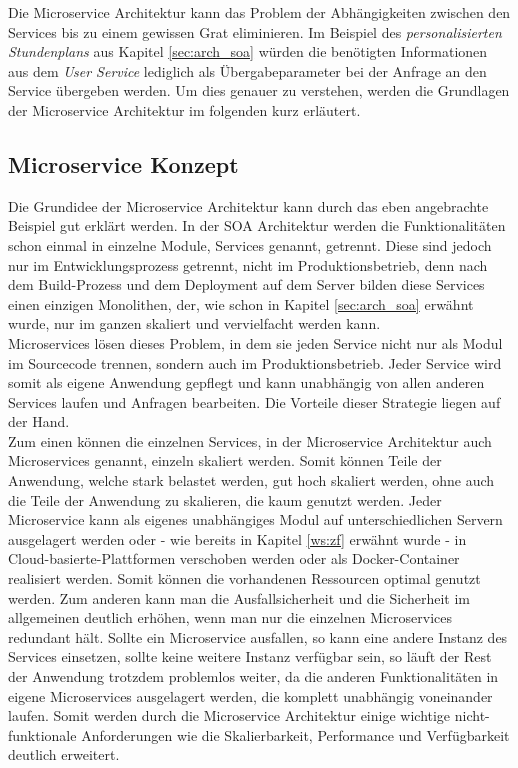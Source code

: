 Die Microservice Architektur kann das Problem der Abhängigkeiten zwischen den Services bis zu einem gewissen Grat eliminieren. Im Beispiel des \textit{personalisierten Stundenplans} aus Kapitel \ref{sec:arch_soa} würden die benötigten Informationen aus dem \textit{User Service} lediglich als Übergabeparameter bei der Anfrage an den Service übergeben werden. Um dies genauer zu verstehen, werden die Grundlagen der Microservice Architektur im folgenden kurz erläutert.

\subsection*{Microservice Konzept}

Die Grundidee der Microservice Architektur kann durch das eben angebrachte Beispiel gut erklärt werden. In der \ac{SOA} Architektur werden die Funktionalitäten schon einmal in einzelne Module, Services genannt, getrennt. Diese sind jedoch nur im Entwicklungsprozess getrennt, nicht im Produktionsbetrieb, denn nach dem Build-Prozess und dem Deployment auf dem Server bilden diese Services einen einzigen Monolithen, der, wie schon in Kapitel \ref{sec:arch_soa} erwähnt wurde, nur im ganzen skaliert und vervielfacht werden kann. 
\\
\linebreak
Microservices lösen dieses Problem, in dem sie jeden Service nicht nur als Modul im Sourcecode trennen, sondern auch im Produktionsbetrieb. Jeder Service wird somit als eigene Anwendung gepflegt und kann unabhängig von allen anderen Services laufen und Anfragen bearbeiten. Die Vorteile dieser Strategie liegen auf der Hand.
\\
\linebreak
Zum einen können die einzelnen Services, in der Microservice Architektur auch Microservices genannt, einzeln skaliert werden. Somit können Teile der Anwendung, welche stark belastet werden, gut hoch skaliert werden, ohne auch die Teile der Anwendung zu skalieren, die kaum genutzt werden. Jeder Microservice kann als eigenes unabhängiges Modul auf unterschiedlichen Servern ausgelagert werden oder - wie bereits in Kapitel \ref{ws:zf} erwähnt wurde - in Cloud-basierte-Plattformen verschoben werden oder als Docker-Container realisiert werden. Somit können die vorhandenen Ressourcen optimal genutzt werden. Zum anderen kann man die Ausfallsicherheit und die Sicherheit im allgemeinen deutlich erhöhen, wenn man nur die einzelnen Microservices redundant hält. Sollte ein Microservice ausfallen, so kann eine andere Instanz des Services einsetzen, sollte keine weitere Instanz verfügbar sein, so läuft der Rest der Anwendung trotzdem problemlos weiter, da die anderen Funktionalitäten in eigene Microservices ausgelagert werden, die komplett unabhängig voneinander laufen. Somit werden durch die Microservice Architektur einige wichtige nicht-funktionale Anforderungen wie die Skalierbarkeit, Performance und Verfügbarkeit deutlich erweitert.  
